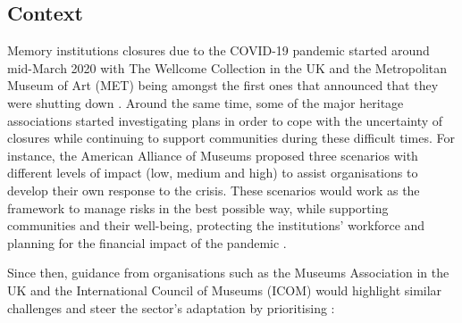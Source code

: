 \documentclass{egpubl}
\begin{document}
\subsection{Context}
\label{con}
Memory institutions closures due to the COVID-19 pandemic started around mid-March 2020 with The Wellcome Collection in the UK and the Metropolitan Museum of Art (MET) being amongst the first ones that announced that they were shutting down \cite{McGivern2020,KendallAdams2020}. Around the same time, some of the major heritage  associations started investigating plans in order to cope with the uncertainty of closures while continuing to support communities during these difficult times. For instance, the American Alliance of Museums proposed three scenarios with different levels of impact (low, medium and high) to assist organisations to develop their own response to the crisis. These scenarios would work as the framework to manage risks in the best possible way, while supporting communities and their well-being, protecting the institutions' workforce and planning for the financial impact of the pandemic \cite{Merritt2020}.

Since then, guidance from organisations such as the Museums Association in the UK and the International Council of Museums (ICOM) would highlight similar challenges and steer the sector's adaptation by prioritising \cite{InternationalCouncilofMuseums2020a,Olorunshola2020,MuseumsAssociation2020}:
 
\end{document}
